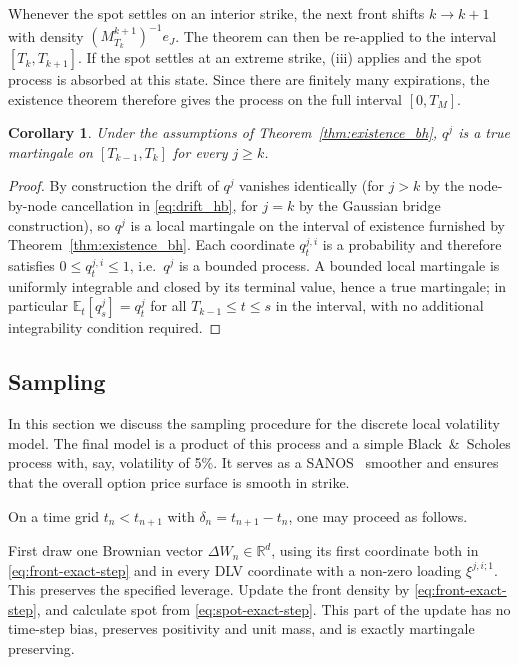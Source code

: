 \documentclass[11pt]{article}
\theoremstyle{plain}
\newtheorem{corollary}[theorem]{Corollary}
\theoremstyle{definition}
\theoremstyle{remark}
\begin{document}
Whenever the spot settles on an interior strike, the next front shifts $k \rightarrow k +1 $ with density $(M^{k+1}_{T_k})^{-1}e_J$. The theorem can then be re-applied to the interval $[T_k, T_{k+1}]$. If the spot settles at an extreme strike, (iii) applies and the spot process is absorbed at this state. Since there are finitely many expirations, the existence theorem therefore gives the process on the full interval $[0, T_M]$. 

\begin{corollary}
\label{cor:true_martingale_mw}
Under the assumptions of Theorem~\ref{thm:existence_bh}, $q^j$ is a true martingale on $[T_{k-1},T_k]$ for every $j\geq k$.
\end{corollary}
\begin{proof}
By construction the drift of $q^j$ vanishes identically (for $j>k$ by the node-by-node cancellation in \eqref{eq:drift_hb}, for $j=k$ by the Gaussian bridge construction), so $q^j$ is a local martingale on the interval of existence furnished by Theorem~\ref{thm:existence_bh}. Each coordinate $q_t^{j,i}$ is a probability and therefore satisfies $0\leq q_t^{j,i}\leq 1$, i.e.\ $q^j$ is a bounded process. A bounded local martingale is uniformly integrable and closed by its terminal value, hence a true martingale; in particular $\mathbb E_t[q_s^j]=q_t^j$ for all $T_{k-1}\leq t\leq s$ in the interval, with no additional integrability condition required.
\end{proof}

\subsection{Sampling}
\label{sec:sampling}

  In this section we discuss the sampling procedure for the discrete local volatility model. The final model is a product of this 
  process and a simple Black~\&~Scholes process with, say, volatility of 5\%. It serves as a SANOS~\citep{SANOS2026} smoother and ensures
  that the overall option price surface is smooth in strike.

   On a time grid
  $t_n<t_{n+1}$ with $\delta_n=t_{n+1}-t_n$, one may proceed as follows.

  First draw one Brownian vector $\Delta W_n\in\mathbb R^d$, using its first
  coordinate both in \eqref{eq:front-exact-step} and in every DLV coordinate
  with a non-zero loading $\xi^{j,i;1}$. This preserves the specified leverage.
  Update the front density by \eqref{eq:front-exact-step}, and calculate spot
  from \eqref{eq:spot-exact-step}. This part of the update has no time-step
  bias, preserves positivity and unit mass, and is exactly martingale
  preserving.
\end{document}
